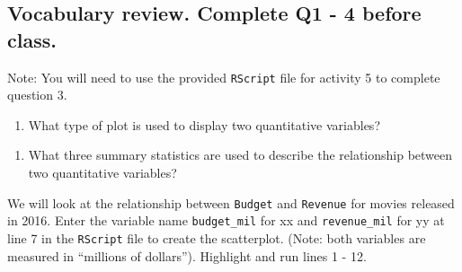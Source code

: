 \documentclass[
]{report}
\newenvironment{Shaded}{\begin{snugshade}}{\end{snugshade}}
\newcommand{\CommentTok}[1]{\textcolor[rgb]{0.56,0.35,0.01}{\textit{#1}}}
\newcommand{\DataTypeTok}[1]{\textcolor[rgb]{0.13,0.29,0.53}{#1}}
\newcommand{\KeywordTok}[1]{\textcolor[rgb]{0.13,0.29,0.53}{\textbf{#1}}}
\newcommand{\NormalTok}[1]{#1}
\newcommand{\OperatorTok}[1]{\textcolor[rgb]{0.81,0.36,0.00}{\textbf{#1}}}
\newcommand{\OtherTok}[1]{\textcolor[rgb]{0.56,0.35,0.01}{#1}}
\newcommand{\StringTok}[1]{\textcolor[rgb]{0.31,0.60,0.02}{#1}}
\providecommand{\tightlist}{%
  \setlength{\itemsep}{0pt}\setlength{\parskip}{0pt}}
\begin{document}
\newpage

\hypertarget{vocabulary-review.-complete-q1---4-before-class.}{%
\subsection*{Vocabulary review. Complete Q1 - 4 before class.}\label{vocabulary-review.-complete-q1---4-before-class.}}

Note: You will need to use the provided \texttt{RScript} file for activity 5 to complete question 3.

\begin{enumerate}
\def\labelenumi{\arabic{enumi}.}
\tightlist
\item
  What type of plot is used to display two quantitative variables?
\end{enumerate}

\vspace{0.2in}

\begin{enumerate}
\def\labelenumi{\arabic{enumi}.}
\setcounter{enumi}{1}
\tightlist
\item
  What three summary statistics are used to describe the relationship between two quantitative variables?
\end{enumerate}

\vspace{0.4in}

We will look at the relationship between \texttt{Budget} and \texttt{Revenue} for movies released in 2016. Enter the variable name \texttt{budget\_mil} for xx and \texttt{revenue\_mil} for yy at line 7 in the \texttt{RScript} file to create the scatterplot. (Note: both variables are measured in ``millions of dollars''). Highlight and run lines 1 - 12.

\begin{Shaded}
\end{Shaded}
\end{document}
